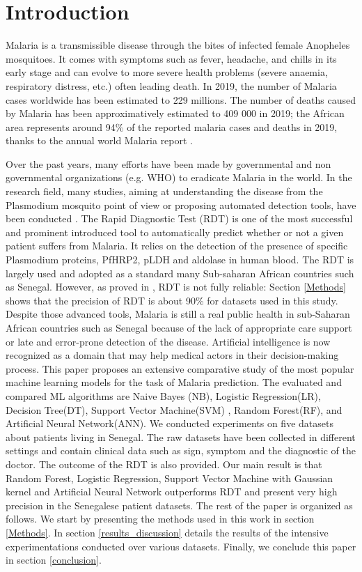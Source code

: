 \section{Introduction}\label{Introduction}
Malaria is a transmissible disease through the bites of infected female Anopheles mosquitoes. It comes with symptoms such as fever, headache, and chills in its early stage and can evolve to more severe health problems (severe anaemia, respiratory distress, etc.) often leading death. In 2019, the number of Malaria cases worldwide has been estimated to 229 millions. The number of deaths caused by Malaria has been approximatively estimated to 409 000 in 2019; the African area represents around 94\% of the reported malaria cases and deaths in 2019, thanks to the annual world Malaria report \cite{19WMR}. 

Over the past years, many efforts have been made by governmental and non governmental organizations (e.g. WHO) to eradicate Malaria in the world.  In the research field, many studies, aiming at understanding the disease from the Plasmodium mosquito point of view or proposing automated detection tools, have been conducted \cite{Ga19,Le74,ermert2011development,Hu17}. The Rapid Diagnostic Test (RDT) \cite{Hu17} is one of the most successful and prominent introduced tool to automatically predict whether or not a given patient suffers from Malaria. It relies on the detection of the presence of specific Plasmodium proteins, PfHRP2, pLDH
and aldolase in human blood. The RDT is largely used and adopted as a standard many Sub-saharan African countries such as Senegal. However, as proved in \cite{Hu17}, RDT is not fully reliable:  Section \ref{Methods} shows that the precision of RDT is about 90\% for datasets used in this study. Despite those advanced tools, Malaria is still a real public health in sub-Saharan African countries such as Senegal because of the lack of appropriate care support or late and error-prone detection of the disease.
Artificial intelligence is now recognized as a domain that may help medical actors in their decision-making process. \cite{mitchell1997machine, Ug1}  
 This paper proposes an  extensive comparative study of the most popular machine learning models for the task of Malaria prediction. The evaluated and compared ML algorithms are Naive Bayes (NB), Logistic Regression(LR),  Decision Tree(DT), Support Vector Machine(SVM) ,
 Random Forest(RF), and Artificial Neural Network(ANN). We conducted experiments on five datasets about patients living in Senegal. The raw
 datasets have been collected in different settings and contain clinical data such as sign, symptom and the diagnostic of the doctor.  The outcome of the RDT is also provided. Our main result is that Random Forest, Logistic Regression, Support Vector Machine with Gaussian kernel and Artificial Neural Network outperforms RDT and present very high precision in the Senegalese patient datasets.
The rest of the paper is organized as follows. We start by presenting the methods used in this work in section \ref{Methods}. In section \ref{results_discussion} details the results of the intensive experimentations conducted over various datasets. Finally, we conclude this paper in section \ref{conclusion}.
